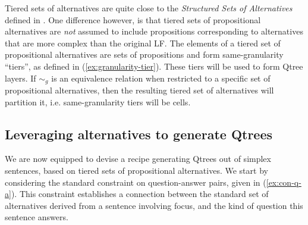 Tiered sets of alternatives are quite close to the \textit{Structured Sets of Alternatives} defined in \citet{Ippolito2019}. One difference however, is that tiered sets of propositional alternatives are \textit{not} assumed to include propositions corresponding to alternatives that are more complex than the original LF. The elements of a tiered set of propositional alternatives are sets of propositions and form same-granularity ``tiers'', as defined in (\ref{ex:granularity-tier}). These tiers will be used to form Qtree layers. If $\sim_g$ is an equivalence relation when restricted to a specific set of propositional alternatives, then the resulting tiered set of alternatives will partition it, i.e. same-granularity tiers will be cells.

\begin{exe}
	\label{ex:granularity-tier}
\end{exe}

\subsection{Leveraging alternatives to generate Qtrees}
We are now equipped to devise a recipe generating Qtrees out of simplex sentences, based on tiered sets of propositional alternatives. We start by considering the standard constraint on question-answer pairs, given in (\ref{ex:con-q-a}). This constraint establishes a connection between the standard set of alternatives derived from a sentence involving focus, and the kind of question this sentence answers.

\begin{exe}
	\label{ex:con-q-a}
\end{exe}

